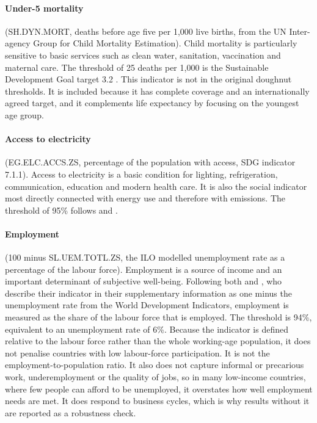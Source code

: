 \paragraph{Under-5 mortality} (SH.DYN.MORT, deaths before age five per 1{,}000 live births, from the UN Inter-agency Group for Child Mortality Estimation). Child mortality is particularly sensitive to basic services such as clean water, sanitation, vaccination and maternal care. The threshold of 25 deaths per 1{,}000 is the Sustainable Development Goal target 3.2 \citep{un2015sdg}. This indicator is not in the original doughnut thresholds. It is included because it has complete coverage and an internationally agreed target, and it complements life expectancy by focusing on the youngest age group.

\paragraph{Access to electricity} (EG.ELC.ACCS.ZS, percentage of the population with access, SDG indicator 7.1.1). Access to electricity is a basic condition for lighting, refrigeration, communication, education and modern health care. It is also the social indicator most directly connected with energy use and therefore with emissions. The threshold of 95\% follows \citet{oneill2018} and \citet{fanning2022}.

\paragraph{Employment} (100 minus SL.UEM.TOTL.ZS, the ILO modelled unemployment rate as a percentage of the labour force). Employment is a source of income and an important determinant of subjective well-being. Following both \citet{oneill2018} and \citet{fanning2022}, who describe their indicator in their supplementary information as one minus the unemployment rate from the World Development Indicators, employment is measured as the share of the labour force that is employed. The threshold is 94\%, equivalent to an unemployment rate of 6\%. Because the indicator is defined relative to the labour force rather than the whole working-age population, it does not penalise countries with low labour-force participation. It is not the employment-to-population ratio. It also does not capture informal or precarious work, underemployment or the quality of jobs, so in many low-income countries, where few people can afford to be unemployed, it overstates how well employment needs are met. It does respond to business cycles, which is why results without it are reported as a robustness check.

